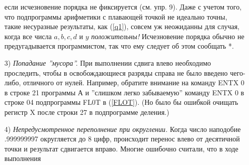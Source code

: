 \begin{enumerate}
если исчезновение порядка не фиксируется (см. упр. 9). Даже с учетом того, что подпрограммы арифметики с плавающей точкой не идеально точны, такие несуразные результаты, как (\ref{q1}), совсем уж неожиданны для случая, когда все числа $a,b,c,d$ и $y$ \textit{положительны!} Исчезновение порядка обычно не предугадывается программистом, так что ему следует об этом сообщать *.

\item[3)] \textit{Попадание ''мусора''.} При выполнении сдвига влево необходимо проследить, чтобы в освобождающиеся разряды справа не было введено чего-либо, отличного от нулей. Например, обратите внимание на команду ENTX 0 в строке 21 программы А и ''слишком легко забываемую'' команду ENTX 0 в строке 04 подпрограммы FL0T в (\ref{FLOT}). (Но было бы ошибкой очищать регистр X после строки 27 в подпрограмме деления.)

\item[4)] \textit{Непредусмотренное переполнение при округлении.} Когда число наподобие .999999997 округляется до 8 цифр, происходит перенос влево от десятичной точки и результат сдвигается вправо. Многие ошибочно считали, что в ходе выполнения


\end{enumerate}
